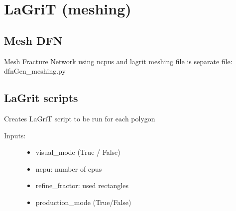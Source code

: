 \documentclass[letterpaper,10pt,english]{sphinxmanual}
\begin{document}
\section{LaGriT (meshing)}
\label{pydfnworks:lagrit-meshing}

\subsection{Mesh DFN}
\label{pydfnworks:module-pydfnworks.meshdfn}\label{pydfnworks:mesh-dfn}\label{pydfnworks:module-meshdfn.py}

\begin{fulllineitems}
\label{pydfnworks:pydfnworks.meshdfn.mesh_network}
Mesh Fracture Network using ncpus and lagrit
meshing file is separate file: dfnGen\_meshing.py

\end{fulllineitems}



\subsection{LaGrit scripts}
\label{pydfnworks:lagrit-scripts}\label{pydfnworks:module-pydfnworks.lagrit_scripts}\label{pydfnworks:module-lagrit_scripts.py}

\begin{fulllineitems}
\label{pydfnworks:pydfnworks.lagrit_scripts.create_lagrit_scripts}
Creates LaGriT script to be run for each polygon
\begin{description}
\item[{Inputs: }] \leavevmode\begin{itemize}
\item {} 
visual\_mode (True / False)

\item {} 
ncpu: number of cpus

\item {} 
refine\_fractor: used rectangles

\item {} 
production\_mode (True/False)

\end{itemize}

\end{description}

\end{fulllineitems}
\end{document}
